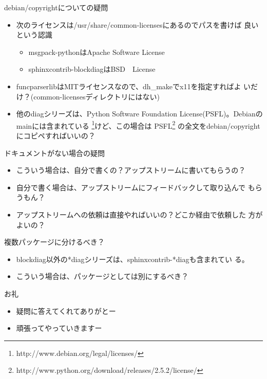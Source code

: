 \begin{frame}{debian/copyrightについての疑問}
 \begin{itemize}
  \item 次のライセンスは/usr/share/common-licensesにあるのでパスを書けば
	良いという認識
	\begin{itemize}
	 \item msgpack-pythonはApache Software License
	 \item sphinxcontrib-blockdiagはBSD　License
	\end{itemize}
  \item funcparserlibはMITライセンスなので、dh\_makeでx11を指定すればよ
	いだけ？(common-licensesディレクトリにはない)
  \item 他のdiagシリーズは、Python Software Foundation License(PSFL)。Debianの
	mainには含まれている
	\footnote{http://www.debian.org/legal/licenses/}けど、この場合は
	PSFL\footnote{http://www.python.org/download/releases/2.5.2/license/}
	の全文をdebian/copyrightにコピペすればいいの？
	\end{itemize}
\end{frame}

\begin{frame}{ドキュメントがない場合の疑問}
 \begin{itemize}
  \item こういう場合は、自分で書くの？アップストリームに書いてもらうの？
  \item 自分で書く場合は、アップストリームにフィードバックして取り込んで
	もらうもん？
  \item アップストリームへの依頼は直接やればいいの？どこか経由で依頼した
	方がよいの？
 \end{itemize}
\end{frame}

\begin{frame}{複数パッケージに分けるべき？}
 \begin{itemize}
  \item blockdiag以外の*diagシリーズは、sphinxcontrib-*diagも含まれてい
	る。
  \item こういう場合は、パッケージとしては別にするべき？
 \end{itemize}
\end{frame}

\begin{frame}{お礼}
\begin{itemize}
 \item 疑問に答えてくれてありがとー
 \item 頑張ってやっていきますー
\end{itemize}
\end{frame}

